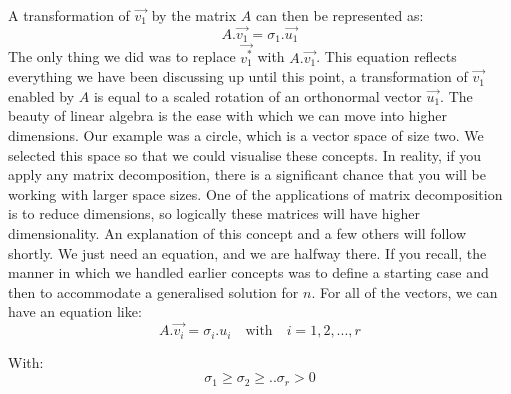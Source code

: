 \documentclass[600paper, 11pt,twoside,openany]{kdp}
\begin{document}
\begin{center}
\end{center}

\indent A transformation of $\overrightarrow{v_1}$ by the matrix $A$ can then be represented as:
\[A.\overrightarrow{v_1} = \sigma_1.\overrightarrow{u_1} \]
\indent The only thing we did was to replace $\overrightarrow{v^*_1}$ with $A.\overrightarrow{v_1}$. This equation reflects everything we have been discussing up until this point, a transformation of $\overrightarrow{v_1}$ enabled by $A$ is equal to a scaled rotation of an orthonormal vector $\overrightarrow{u_1}$. The beauty of linear algebra is the ease with which we can move into higher dimensions. Our example was a circle, which is a vector space of size two. We selected this space so that we could visualise these concepts. In reality, if you apply any matrix decomposition, there is a significant chance that you will be working with larger space sizes. One of the applications of matrix decomposition is to reduce dimensions, so logically these matrices will have higher dimensionality. An explanation of this concept and a few others will follow shortly. We just need an equation, and we are halfway there. If you recall, the manner in which we handled earlier concepts was to define a starting case and then to accommodate a generalised solution for $n$. For all of the vectors, we can have an equation like:
\begin{equation} \label{eq:svd}
 A.\overrightarrow{v_i} = \sigma_i. u_i  \quad \textrm{with}  \quad i = 1,2,...,r
\end{equation}

\indent With:
\[ \sigma_1 \geq \sigma_2 \geq .. \sigma_r > 0 \]
\end{document}
